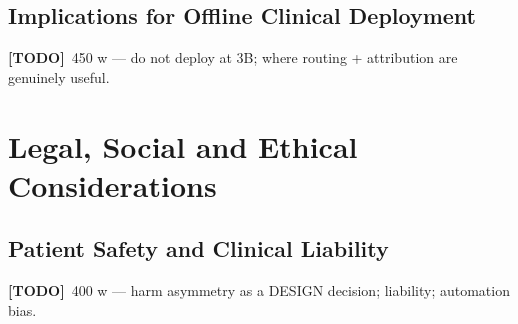 \documentclass[11pt,a4paper]{report}
\newcommand{\todo}[1]{\par\noindent\textcolor{red!70!black}{\small\textbf{[TODO]}~#1}\par}
\begin{document}
\section{Implications for Offline Clinical Deployment}
\label{sec:disc-deployment}
\todo{450 w — do not deploy at 3B; where routing + attribution are genuinely useful.}

\chapter{Legal, Social and Ethical Considerations}
\label{ch:lsep}

\section{Patient Safety and Clinical Liability}
\label{sec:lsep-safety}
\todo{400 w — harm asymmetry as a DESIGN decision; liability; automation bias.}
\end{document}
